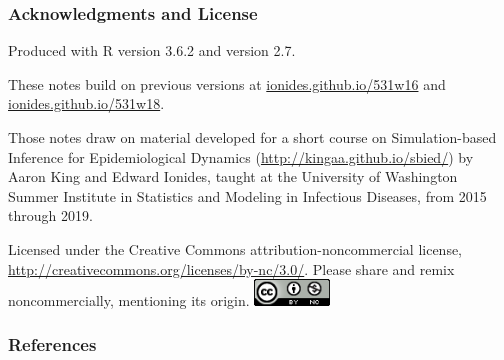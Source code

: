 \documentclass{beamer}\usepackage[]{graphicx}\usepackage[]{color}
\begin{document}
\begin{frame}[fragile]
\frametitle{Acknowledgments and License}

\bi
\item Produced with R version 3.6.2 and  version 2.7.

\item These notes build on previous versions at \url{ionides.github.io/531w16} and \url{ionides.github.io/531w18}. 
\item Those notes draw on material developed for a short course on Simulation-based Inference for Epidemiological Dynamics (\url{http://kingaa.github.io/sbied/}) by Aaron King and Edward Ionides, taught at the University of Washington Summer Institute in Statistics and Modeling in Infectious Diseases, from 2015 through 2019.
\item
Licensed under the Creative Commons attribution-noncommercial license, \url{http://creativecommons.org/licenses/by-nc/3.0/}.
Please share and remix noncommercially, mentioning its origin.  
\includegraphics[width=2cm]{cc-by-nc.png}
\ei

\end{frame}


\begin{frame}[allowframebreaks]
\frametitle{References}

\end{frame}
\end{document}
